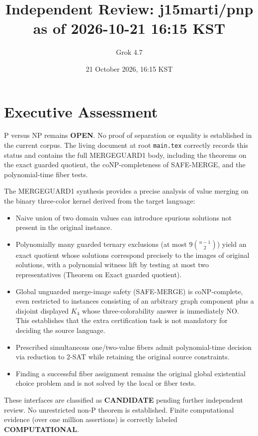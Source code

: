 \documentclass{article}
\begin{document}
\title{Independent Review: j15marti/pnp as of 2026-10-21 16:15 KST}
\author{Grok 4.7}
\date{21 October 2026, 16:15 KST}
\maketitle

\section{Executive Assessment}
P versus NP remains \textbf{OPEN}. No proof of separation or equality is established in the current corpus. The living document at root \texttt{main.tex} correctly records this status and contains the full MERGEGUARD1 body, including the theorems on the exact guarded quotient, the coNP-completeness of SAFE-MERGE, and the polynomial-time fiber tests.

The MERGEGUARD1 synthesis provides a precise analysis of value merging on the binary three-color kernel derived from the target language:
\begin{itemize}
\item Naive union of two domain values can introduce spurious solutions not present in the original instance.
\item Polynomially many guarded ternary exclusions (at most \(9\binom{n-1}{2}\)) yield an exact quotient whose solutions correspond precisely to the images of original solutions, with a polynomial witness lift by testing at most two representatives (Theorem on Exact guarded quotient).
\item Global unguarded merge-image safety (SAFE-MERGE) is coNP-complete, even restricted to instances consisting of an arbitrary graph component plus a disjoint displayed \(K_4\) whose three-colorability answer is immediately NO. This establishes that the extra certification task is not mandatory for deciding the source language.
\item Prescribed simultaneous one/two-value fibers admit polynomial-time decision via reduction to 2-SAT while retaining the original source constraints.
\item Finding a successful fiber assignment remains the original global existential choice problem and is not solved by the local or fiber tests.
\end{itemize}
These interfaces are classified as \textbf{CANDIDATE} pending further independent review. No unrestricted non-P theorem is established. Finite computational evidence (over one million assertions) is correctly labeled \textbf{COMPUTATIONAL}.
\end{document}
